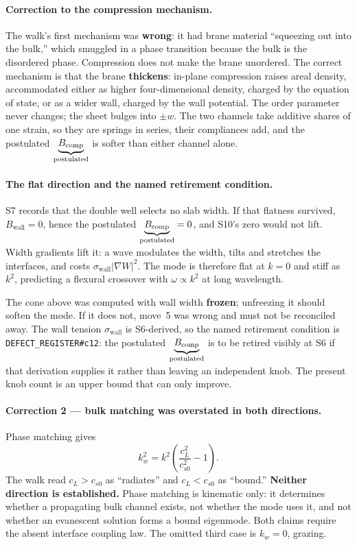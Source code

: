 \paragraph{Correction to the compression mechanism.}
The walk's first mechanism was \textbf{wrong}: it had brane material
``squeezing out into the bulk,'' which smuggled in a phase transition because
the bulk is the disordered phase. Compression does not make the brane
unordered. The correct mechanism is that the brane \textbf{thickens}: in-plane
compression raises areal density, accommodated either as higher four-dimensional
density, charged by the equation of state, or as a wider wall, charged by the
wall potential. The order parameter never changes; the sheet bulges into
\(\pm w\). The two channels take additive shares of one strain, so they are
springs in series, their compliances add, and the postulated \(\underbrace{B_{\mathrm{comp}}}_{\text{\scriptsize postulated}}\) is
softer than either channel alone.

\paragraph{The flat direction and the named retirement condition.}
S7 records that the double well selects no slab width. If that flatness
survived, \(B_{\mathrm{wall}}=0\), hence the postulated \(\underbrace{B_{\mathrm{comp}}}_{\text{\scriptsize postulated}}=0\), and
S10's zero would not lift. Width gradients lift it: a wave modulates the width,
tilts and stretches the interfaces, and costs
\(\sigma_{\mathrm{wall}}|\nabla W|^2\). The mode is therefore flat at \(k=0\)
and stiff as \(k^2\), predicting a flexural crossover with
\(\omega\propto k^2\) at long wavelength.

The cone above was computed with wall width \textbf{frozen}; unfreezing it
should soften the mode. If it does not, move~5 was wrong and must not be
reconciled away. The wall tension \(\sigma_{\mathrm{wall}}\) is S6-derived, so
the named retirement condition is
\texttt{DEFECT\_REGISTER\#c12}: the postulated \(\underbrace{B_{\mathrm{comp}}}_{\text{\scriptsize postulated}}\) is to be retired
visibly at S6 if that derivation supplies it rather than leaving an independent
knob. The present knob count is an upper bound that can only improve.

\paragraph{Correction 2 --- bulk matching was overstated in both directions.}
Phase matching gives
\[
  k_w^2=k^2\left(\frac{c_L^2}{c_{s0}^2}-1\right).
\]
The walk read \(c_L>c_{s0}\) as ``radiates'' and \(c_L<c_{s0}\) as ``bound.''
\textbf{Neither direction is established.} Phase matching is kinematic only:
it determines whether a propagating bulk channel exists, not whether the mode
uses it, and not whether an evanescent solution forms a bound eigenmode. Both
claims require the absent interface coupling law. The omitted third case is
\(k_w=0\), grazing.


